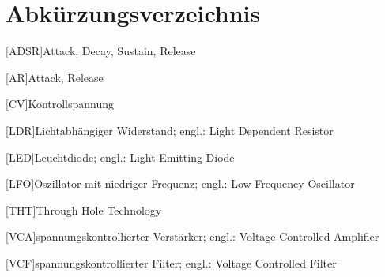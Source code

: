 
\chapter{Abkürzungsverzeichnis}

\begin{acronym}
[ADSR]{Attack, Decay, Sustain, Release}
\end{acronym}

\begin{acronym}
[AR]{Attack, Release}
\end{acronym}

\begin{acronym}
[CV]{Kontrollspannung}
\end{acronym}

\begin{acronym}
[LDR]{Lichtabhängiger Widerstand; engl.: Light Dependent Resistor}
\end{acronym}

\begin{acronym}
[LED]{Leuchtdiode; engl.: Light Emitting Diode}
\end{acronym}

\begin{acronym}
[LFO]{Oszillator mit niedriger Frequenz; engl.: Low Frequency Oscillator}
\end{acronym}

\begin{acronym}
[THT]{Through Hole Technology}
\end{acronym}

\begin{acronym}
[VCA]{spannungskontrollierter Verstärker; engl.: Voltage Controlled Amplifier}
\end{acronym}

\begin{acronym}
[VCF]{spannungskontrollierter Filter; engl.: Voltage Controlled Filter}
\end{acronym}
